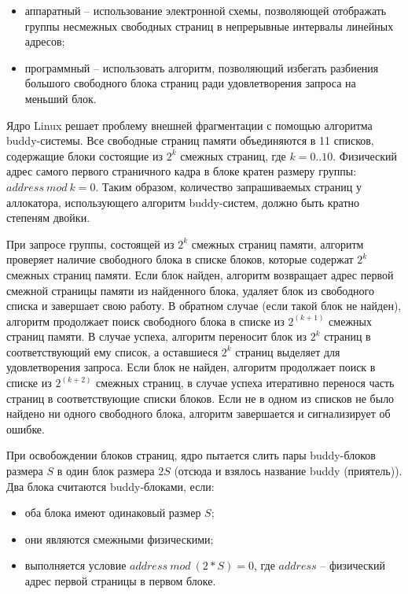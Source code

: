\begin{itemize}
	\item аппаратный -- использование электронной схемы, позволяющей отображать группы несмежных свободных страниц в непрерывные интервалы линейных адресов;
	\item программный -- использовать алгоритм, позволяющий избегать разбиения большого свободного блока страниц ради удовлетворения запроса на меньший блок.
\end{itemize}

Ядро Linux решает проблему внешней фрагментации с помощью алгоритма buddy-системы. Все свободные страниц памяти объединяются в 11 списков, содержащие блоки состоящие из $2^k$ смежных страниц, где $k = 0..10$. Физический адрес самого первого страничного кадра в блоке кратен размеру группы: $address \ mod \ k = 0$. Таким образом, количество запрашиваемых страниц у аллокатора, использующего алгоритм buddy-систем, должно быть кратно степеням двойки.

При запросе группы, состоящей из $2^k$ смежных страниц памяти, алгоритм проверяет наличие свободного блока в списке блоков, которые содержат $2^k$ смежных страниц памяти. Если блок найден, алгоритм возвращает адрес первой смежной страницы памяти из найденного блока, удаляет блок из свободного списка и завершает свою работу. В обратном случае (если такой блок не найден), алгоритм продолжает поиск свободного блока в списке из $2^(k + 1)$ смежных страниц памяти. В случае успеха, алгоритм переносит блок из $2^k$ страниц в соответствующий ему список, а оставшиеся $2^k$ страниц выделяет для удовлетворения запроса. Если блок не найден, алгоритм продолжает поиск в списке из $2^(k + 2)$ смежных страниц, в случае успеха итеративно перенося часть страниц в соответствующие списки блоков. Если не в одном из списков не было найдено ни одного свободного блока, алгоритм завершается и сигнализирует об ошибке. 

При освобождении блоков страниц, ядро пытается слить пары buddy-блоков размера $S$ в один блок размера $2S$ (отсюда и взялось название buddy (приятель)). Два блока считаются buddy-блоками, если:

\begin{itemize}
	\item оба блока имеют одинаковый размер $S$;
	\item они являются смежными физическими;
	\item выполняется условие $address\ mod\ (2 * S) = 0$, где $address$ -- физический адрес первой страницы в первом блоке.
\end{itemize}

